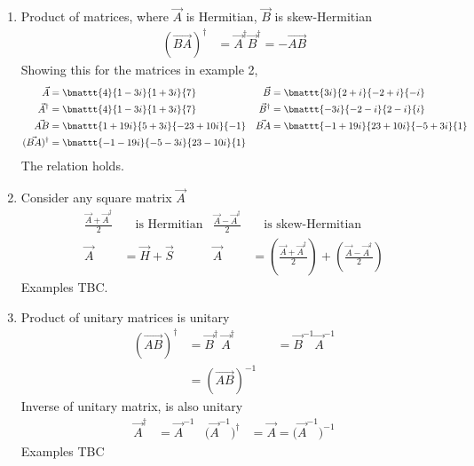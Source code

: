 \begin{enumerate}
    \item Product of matrices, where $ \vec{A} $ is Hermitian, $ \vec{B} $ is
          skew-Hermitian
          \begin{align}
              (\vec{BA})^\dag & = \vec{A}^\dag \vec{B}^\dag = -\vec{AB}
          \end{align}
          Showing this for the matrices in example 2,
          \begin{align}
              \vec{A}         & = \bmattt{4}{1-3i}{1+3i}{7}               &
              \vec{B}         & = \bmattt{3i}{2+i}{-2+i}{-i}                \\
              \vec{A}^\dag    & = \bmattt{4}{1-3i}{1+3i}{7}               &
              \vec{B}^\dag    & = \bmattt{-3i}{-2-i}{2-i}{i}                \\
              \vec{AB}        & = \bmattt{1 + 19i}{5 + 3i}{-23 + 10i}{-1} &
              \vec{BA}        & = \bmattt{-1 + 19i}{23 + 10i}{-5 + 3i}{1}   \\
              (\vec{BA})^\dag & = \bmattt{-1 - 19i}{-5 -3i}{23 - 10i}{1}
          \end{align}
          The relation holds.

    \item Consider any square matrix $ \vec{A} $
          \begin{align}
              \frac{\vec{A} + \vec{A}^\dag}{2} & \quad \text{is Hermitian}      &
              \frac{\vec{A} - \vec{A}^\dag}{2} & \quad \text{is skew-Hermitian}   \\
              \vec{A}                          & = \vec{H} + \vec{S}            &
              \vec{A}                          & =
              \left( \frac{\vec{A} + \vec{A}^\dag}{2} \right)
              + \left( \frac{\vec{A} - \vec{A}^\dag}{2} \right)
          \end{align}
          Examples TBC.

    \item Product of unitary matrices is unitary
          \begin{align}
              (\vec{AB})^\dag & = \vec{B}^\dag\ \vec{A}^\dag &
                              & = \vec{B}^{-1}\vec{A}^{-1}     \\
                              & = (\vec{AB})^{-1}
          \end{align}
          Inverse of unitary matrix, is also unitary
          \begin{align}
              \vec{A}^\dag                & = \vec{A}^{-1}                            &
              \Big(\vec{A}^{-1}\Big)^\dag & = \vec{A} = \Big( \vec{A}^{-1} \Big)^{-1}
          \end{align}
          Examples TBC


\end{enumerate}
